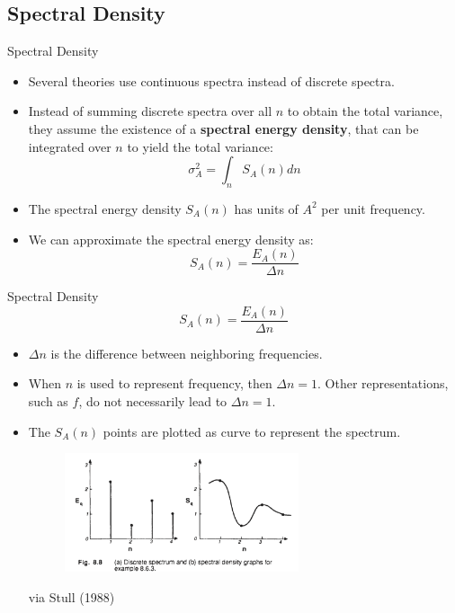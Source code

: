 \subsection{Spectral Density} %
\begin{frame}{Spectral Density}
\begin{itemize}
	\item Several theories use continuous spectra instead of discrete spectra.
	\item Instead of summing discrete spectra over all $n$ to obtain the total variance, they assume the existence of a \textbf{spectral energy density}, that can be integrated over $n$ to yield the total variance:
	$$\sigma_A^2 = \displaystyle \int_n S_A(n) dn$$
	\item The spectral energy density $S_A(n)$ has units of $A^2$ per unit frequency.
	\item We can approximate the spectral energy density as:
	$$S_A(n) = \frac{E_A(n)}{\Delta n}$$
\end{itemize}
\end{frame}
\begin{frame}{Spectral Density}
$$S_A(n) = \frac{E_A(n)}{\Delta n}$$
\begin{itemize}
	\item $\Delta n$ is the difference between neighboring frequencies.
	\item When $n$ is used to represent frequency, then $\Delta n = 1$. Other representations, such as $f$, do not necessarily lead to $\Delta n = 1$.
	\item The $S_A(n)$ points are plotted as curve to represent the spectrum.
	\begin{figure}
	\includegraphics[width=0.65\textwidth]{spectra1.png}	
	\end{figure}
	\centering\tiny via Stull (1988)
\end{itemize}
\end{frame}
